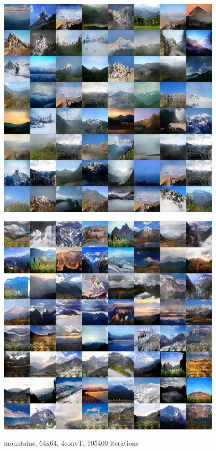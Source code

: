 \documentclass{article}
\begin{document}
\begin{CJK*}{UTF8}{gbsn}
	\begin{figure}[htbp]
		\begin{minipage}{0.5\linewidth}
			\label{m1}
			\centering\includegraphics[scale=0.35]{res/mountain-64-4conv-105400.png}
			\caption{mountains, 64x64, 4convT, 105400 iterations}
		\end{minipage}
		\begin{minipage}{0.5\linewidth}
			\label{m2}
			\centering\includegraphics[scale=0.35]{res/mountain-128-5conv-17200.png}

\end{minipage}
\end{figure}
\end{CJK*}
\end{document}

